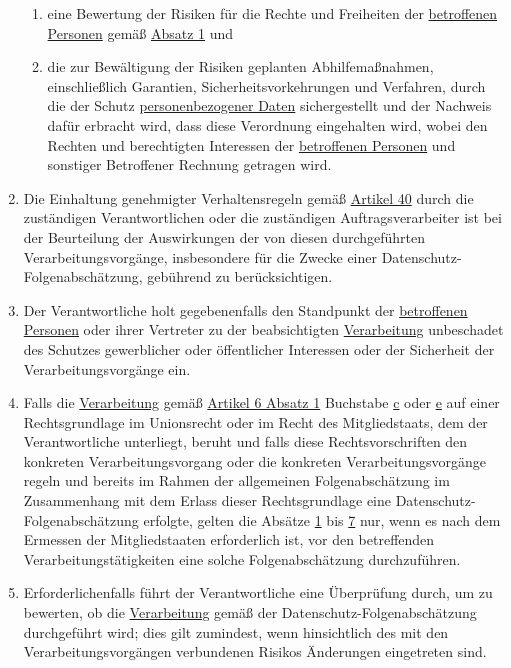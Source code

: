 \begin{enumerate}
\begin{enumerate}
    \item eine Bewertung der Risiken für die Rechte und Freiheiten der \hyperref[itm:04-1]{betroffenen Personen} gemäß \hyperref[itm:35-1]
     {Absatz 1} und
    \label{itm:35-7c}

    \item die zur Bewältigung der Risiken geplanten Abhilfemaßnahmen, einschließlich Garantien, Sicherheitsvorkehrungen
     und Verfahren, durch die der Schutz \hyperref[itm:04-1]{personenbezogener Daten} sichergestellt und der Nachweis dafür erbracht wird,
     dass diese Verordnung eingehalten wird, wobei den Rechten und berechtigten Interessen der \hyperref[itm:04-1]{betroffenen Personen} und
     sonstiger Betroffener Rechnung getragen wird.
    \label{itm:35-7d}

  \end{enumerate}

  \item Die Einhaltung genehmigter Verhaltensregeln gemäß \hyperref[ch:40]{Artikel 40} durch die zuständigen
   Verantwortlichen oder die zuständigen Auftragsverarbeiter ist bei der Beurteilung der Auswirkungen der von diesen
   durchgeführten Verarbeitungsvorgänge, insbesondere für die Zwecke einer Datenschutz-Folgenabschätzung, gebührend zu
   berücksichtigen.
  \label{itm:35-8}

  \item Der Verantwortliche holt gegebenenfalls den Standpunkt der \hyperref[itm:04-1]{betroffenen Personen} oder ihrer Vertreter zu der
   beabsichtigten \hyperref[itm:04-2]{Verarbeitung} unbeschadet des Schutzes gewerblicher oder öffentlicher Interessen oder der Sicherheit
   der Verarbeitungsvorgänge ein.
  \label{itm:35-9}

  \item Falls die \hyperref[itm:04-2]{Verarbeitung} gemäß \hyperref[itm:06-1]{Artikel 6 Absatz 1} Buchstabe \hyperref[itm:06-1c]
   {c} oder \hyperref[itm:06-1e]{e} auf einer Rechtsgrundlage im Unionsrecht oder im Recht des Mitgliedstaats, dem der
   Verantwortliche unterliegt, beruht und falls diese Rechtsvorschriften den konkreten Verarbeitungsvorgang oder die
   konkreten Verarbeitungsvorgänge regeln und bereits im Rahmen der allgemeinen Folgenabschätzung im Zusammenhang mit
   dem Erlass dieser Rechtsgrundlage eine Datenschutz-Folgenabschätzung erfolgte, gelten die Absätze \hyperref
   [itm:35-1]{1} bis \hyperref[itm:35-7]{7} nur, wenn es nach dem Ermessen der Mitgliedstaaten erforderlich ist, vor
   den betreffenden Verarbeitungstätigkeiten eine solche Folgenabschätzung durchzuführen.
  \label{itm:35-10}

  \item Erforderlichenfalls führt der Verantwortliche eine Überprüfung durch, um zu bewerten, ob die \hyperref[itm:04-2]{Verarbeitung} gemäß
   der Datenschutz-Folgenabschätzung durchgeführt wird; dies gilt zumindest, wenn hinsichtlich des mit den
   Verarbeitungsvorgängen verbundenen Risikos Änderungen eingetreten sind.
  \label{itm:35-11}

\end{enumerate}


